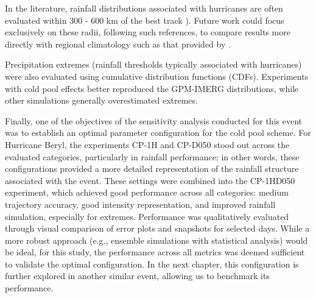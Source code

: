 In the literature, rainfall distributions associated with hurricanes are often evaluated within 300 - 600 km of the best track \cite{lonfat2004precipitation, marchok2007validation, brackins2020evaluation}). Future work could focus exclusively on these radii, following such references, to compare results more directly with regional climatology such as that provided by .

Precipitation extremes (rainfall thresholds typically associated with hurricanes) were also evaluated using cumulative distribution functions (CDFs). Experiments with cold pool effects better reproduced the GPM-IMERG distributions, while other simulations generally overestimated extremes.

Finally, one of the objectives of the sensitivity analysis conducted for this event was to establish an optimal parameter configuration for the cold pool scheme. For Hurricane Beryl, the experiments CP-1H and CP-D050 stood out across the evaluated categories, particularly in rainfall performance; in other words, these configurations provided a more detailed representation of the rainfall structure associated with the event. These settings were combined into the CP-1HD050 experiment, which achieved good performance across all categories: medium trajectory accuracy, good intensity representation, and improved rainfall simulation, especially for extremes. Performance was qualitatively evaluated through visual comparison of error plots and snapshots for selected days. While a more robust approach (e.g., ensemble simulations with statistical analysis) would be ideal, for this study, the performance across all metrics was deemed sufficient to validate the optimal configuration. In the next chapter, this configuration is further explored in another similar event, allowing us to benchmark its performance.

